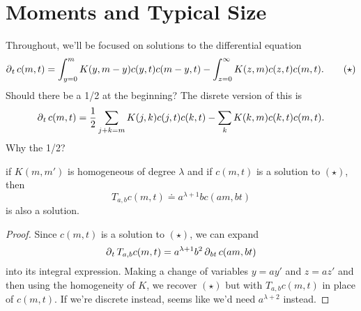 \documentclass[twoside,10pt]{report}
\begin{document}


\section{Moments and Typical Size}

Throughout, we'll be focused on solutions to the differential equation
\[
	\operatorname{\partial}_{t}{c(m,t)} = \int_{y=0}^{m} K(y,m-y) c(y,t) c(m-y,t) - \int_{z=0}^{\infty} K(z,m) c(z,t) c(m,t).\tag{$\star$}
\] 
{\color{red}Should there be a 1/2 at the beginning?} The disrete version of this is
\[
\operatorname{\partial}_{t}{c(m,t)} = \frac{1}{2} \sum_{j+k=m}K(j,k)c(j,t)c(k,t) - \sum_{k}K(k,m)c(k,t)c(m,t).
\] {\color{red}Why the 1/2?}

\begin{prop}
	if $K(m,m')$ is homogeneous of degree $\lambda$ and if $c(m,t)$ is a solution to $(\star)$, then
\[
	T_{a,b}c(m,t) \doteq a^{\lambda+1}bc(am,bt)
\] is also a solution. 
\end{prop}
\begin{proof}
	Since $c(m,t)$ is a solution to $(\star)$, we can expand
	\[
		\operatorname{\partial}_{t}{T_{a,b}c(m,t)} = a^{\lambda+1}b^{2} \operatorname{\partial}_{bt}{c(am,bt)} 
	\] into its integral expression. Making a change of variables $y=ay'$ and $z=az'$ and then using the homogeneity of $K$, we recover $(\star)$ but with $T_{a,b}c(m,t)$ in place of $c(m,t)$.
	{\color{red}If we're discrete instead, seems like we'd need $a^{\lambda+2}$ instead.}
\end{proof}
\end{document}

